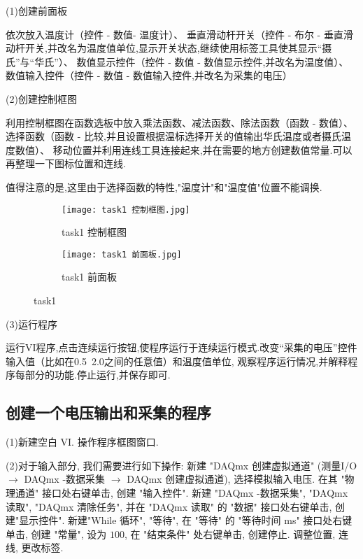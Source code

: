 \documentclass[11pt]{article}
\begin{document}
(1)创建前面板

依次放入温度计（控件 - 数值- 温度计）、
垂直滑动杆开关（控件 - 布尔 - 垂直滑动杆开关,并改名为温度值单位,显示开关状态,继续使用标签工具使其显示“摄氏”与“华氏”）、
数值显示控件（控件 - 数值 - 数值显示控件,并改名为温度值）、
数值输入控件（控件 - 数值 - 数值输入控件,并改名为采集的电压）

(2)创建控制框图

利用控制框图在函数选板中放入乘法函数、减法函数、除法函数（函数 - 数值）、
选择函数（函数 - 比较,并且设置根据温标选择开关的值输出华氏温度或者摄氏温度数值）、
移动位置并利用连线工具连接起来,并在需要的地方创建数值常量.可以再整理一下图标位置和连线.

值得注意的是,这里由于选择函数的特性,"温度计"和"温度值"位置不能调换.

\begin{figure}[htbp]
	\centering
	\begin{subfigure}[t]{0.45\textwidth}  %
		\centering
		\texttt{[image: task1 控制框图.jpg]}  %
		\caption{task1 控制框图}
		\label{fig:task1 控制框图}
	\end{subfigure}
	\begin{subfigure}[t]{0.45\textwidth}  %
		\centering
		\texttt{[image: task1 前面板.jpg]}  %
		\caption{task1 前面板}
		\label{fig:task1 前面板}
	\end{subfigure}
	\caption{task1}
	\label{fig:task1}
\end{figure}

(3)运行程序

运行VI程序,点击连续运行按钮,使程序运行于连续运行模式.改变“采集的电压”控件输入值（比如在0.5~2.0之间的任意值）和温度值单位,
观察程序运行情况,并解释程序每部分的功能.停止运行,并保存即可.


\subsection{创建一个电压输出和采集的程序}

(1)新建空白 VI. 操作程序框图窗口.

(2)对于输入部分, 我们需要进行如下操作: 新建 "DAQmx 创建虚拟通道" 
(测量I/O $\to$ DAQmx -数据采集 $\to$ DAQmx 创建虚拟通道), 选择模拟输入电压. 
在其  "物理通道"  接口处右键单击, 创建 "输入控件". 新建 "DAQmx -数据采集", 
"DAQmx 读取", "DAQmx 清除任务", 并在 "DAQmx 读取" 的  "数据"  接口处右键单击, 
创建"显示控件". 新建"While 循环", "等待", 在 "等待" 的 "等待时间 ms" 接口处右键单击, 
创建 "常量", 设为 $100$, 在 "结束条件" 处右键单击, 创建停止. 调整位置, 连线, 更改标签.
\end{document}
